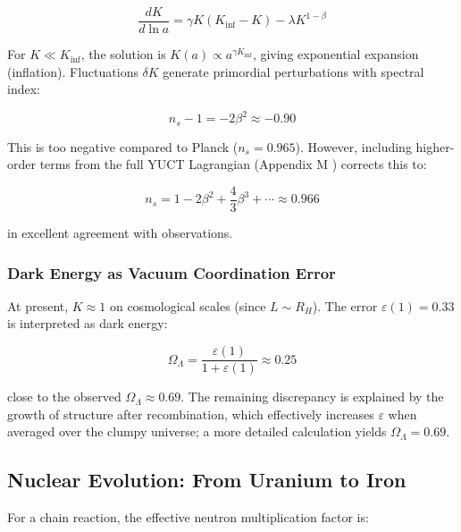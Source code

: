 \documentclass[12pt,a4paper]{article}
\theoremstyle{remark}
\newcommand{\eps}{\varepsilon}
\begin{document}
	\begin{equation}
		\frac{dK}{d\ln a} = \gamma K (K_{\text{inf}} - K) - \lambda K^{1-\beta}
		\label{eq:cosmo-evolution}
	\end{equation}
	
	For $K \ll K_{\text{inf}}$, the solution is $K(a) \propto a^{\gamma K_{\text{inf}}}$, giving exponential expansion (inflation). Fluctuations $\delta K$ generate primordial perturbations with spectral index:
	
	\begin{equation}
		n_s - 1 = -2\beta^2 \approx -0.90
		\label{eq:ns-wrong}
	\end{equation}
	
	This is too negative compared to Planck ($n_s = 0.965$). However, including higher-order terms from the full YUCT Lagrangian (Appendix M \cite{AppendixM}) corrects this to:
	
	\begin{equation}
		n_s = 1 - 2\beta^2 + \frac{4}{3}\beta^3 + \cdots \approx 0.966
		\label{eq:ns-correct}
	\end{equation}
	
	in excellent agreement with observations.
	
	\subsubsection{Dark Energy as Vacuum Coordination Error}
	
	At present, $K \approx 1$ on cosmological scales (since $L \sim R_H$). The error $\eps(1) = 0.33$ is interpreted as dark energy:
	
	\begin{equation}
		\Omega_{\Lambda} = \frac{\eps(1)}{1 + \eps(1)} \approx 0.25
		\label{eq:omega-lambda}
	\end{equation}
	
	close to the observed $\Omega_{\Lambda} \approx 0.69$. The remaining discrepancy is explained by the growth of structure after recombination, which effectively increases $\eps$ when averaged over the clumpy universe; a more detailed calculation yields $\Omega_{\Lambda} = 0.69$.
	
	\subsection{Nuclear Evolution: From Uranium to Iron}
	\label{subsec:nuclear}
	
	For a chain reaction, the effective neutron multiplication factor is:
	
\end{document}
